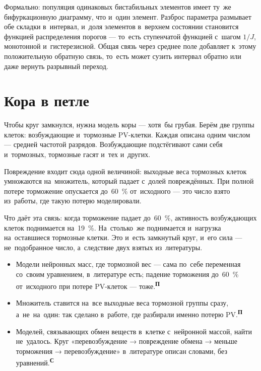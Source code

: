 \documentclass[11pt,a4paper,landscape,twocolumn]{article}
\newcommand{\tS}{\textsuperscript{\sffamily\bfseries\color{cB}С}}
\newcommand{\tP}{\textsuperscript{\sffamily\bfseries\color{cA}П}}
\newcommand{\facts}{\par\vspace{3pt}{\sffamily\bfseries\small\color{cM}Опорные факты}\par\vspace{-2pt}}
\begin{document}
\begin{ineq}
Формально: популяция одинаковых бистабильных элементов имеет ту~же бифуркационную диаграмму, что и~один элемент. Разброс параметра размывает обе складки в~интервал, и~доля элементов в~верхнем состоянии становится функцией распределения порогов — то~есть ступенчатой функцией с~шагом $1/J$, монотонной и~гистерезисной. Общая связь через среднее поле добавляет к~этому положительную обратную связь, то~есть может сузить интервал обратно или даже вернуть разрывный переход.
\end{ineq}

\section{Кора в петле}\label{sec:loop}
Чтобы круг замкнулся, нужна модель коры — хотя~бы грубая. Берём две группы клеток: возбуждающие и~тормозные PV-клетки. Каждая описана одним числом — средней частотой разрядов. Возбуждающие подстёгивают сами себя и~тормозных, тормозные гасят и~тех и~других.

Повреждение входит сюда одной величиной: выходные веса тормозных клеток умножаются на~множитель, который падает с~долей повреждённых. При полной потере торможение опускается до~60~\% от~исходного — это число взято из~работы, где такую потерю моделировали.

Что даёт эта связь: когда торможение падает до~60~\%, активность возбуждающих клеток поднимается на~19~\%. На~столько~же поднимается и~нагрузка на~оставшиеся тормозные клетки. Это и~есть замкнутый круг, и~его сила — не~подобранное число, а~следствие двух взятых из~литературы.

\facts
\begin{itemize}
\item Модели нейронных масс, где тормозной вес — сама по~себе переменная со~своим уравнением, в~литературе есть; падение торможения до~60~\% от~исходного при потере PV-клеток — тоже.\tP
\item Множитель ставится на~все выходные веса тормозной группы сразу, а~не~на~один: так сделано в~работе, где разбирали именно потерю PV.\tP
\item Моделей, связывающих обмен веществ в~клетке с~нейронной массой, найти не~удалось. Круг «перевозбуждение → повреждение обмена → меньше торможения → перевозбуждение» в~литературе описан словами, без уравнений.\tS
\end{itemize}
\end{document}
